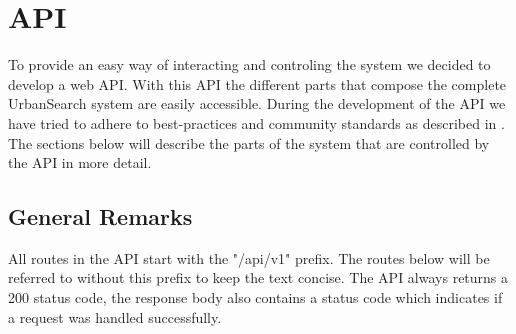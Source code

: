 \section{API}\label{sec: 5-API}
To provide an easy way of interacting and controling the system we decided to develop a web API. With this API the different parts that compose the complete UrbanSearch system are easily accessible. During the development of the API we have tried to adhere to best-practices and community standards as described in \cite{apigee}. The sections below will describe the parts of the system that are controlled by the API in more detail.

\subsection{General Remarks}

All routes in the API start with the "/api/v1" prefix. The routes below will be referred to without this prefix to keep the text concise. The API always returns a 200 status code, the response body also contains a status code which indicates if a request was handled successfully.





